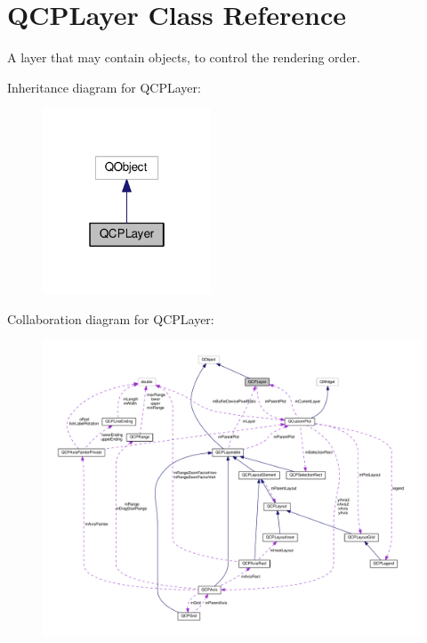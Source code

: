 \hypertarget{classQCPLayer}{}\section{Q\+C\+P\+Layer Class Reference}
\label{classQCPLayer}


A layer that may contain objects, to control the rendering order.  




Inheritance diagram for Q\+C\+P\+Layer\+:
\nopagebreak
\begin{figure}[H]
\begin{center}
\leavevmode
\includegraphics[width=142pt]{classQCPLayer__inherit__graph}
\end{center}
\end{figure}


Collaboration diagram for Q\+C\+P\+Layer\+:
\nopagebreak
\begin{figure}[H]
\begin{center}
\leavevmode
\includegraphics[width=350pt]{classQCPLayer__coll__graph}
\end{center}
\end{figure}
